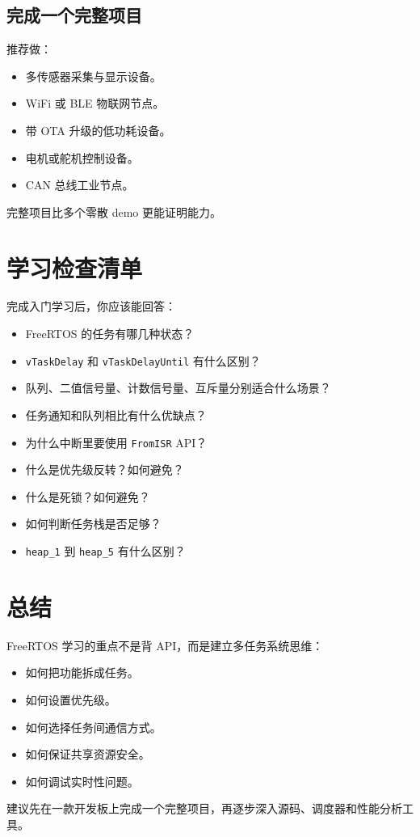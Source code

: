 \documentclass[12pt,a4paper]{ctexart}
\begin{document}
\subsection{完成一个完整项目}

推荐做：

\begin{itemize}
    \item 多传感器采集与显示设备。
    \item WiFi 或 BLE 物联网节点。
    \item 带 OTA 升级的低功耗设备。
    \item 电机或舵机控制设备。
    \item CAN 总线工业节点。
\end{itemize}

完整项目比多个零散 demo 更能证明能力。

\section{学习检查清单}

完成入门学习后，你应该能回答：

\begin{itemize}
    \item FreeRTOS 的任务有哪几种状态？
    \item \texttt{vTaskDelay} 和 \texttt{vTaskDelayUntil} 有什么区别？
    \item 队列、二值信号量、计数信号量、互斥量分别适合什么场景？
    \item 任务通知和队列相比有什么优缺点？
    \item 为什么中断里要使用 \texttt{FromISR} API？
    \item 什么是优先级反转？如何避免？
    \item 什么是死锁？如何避免？
    \item 如何判断任务栈是否足够？
    \item \texttt{heap\_1} 到 \texttt{heap\_5} 有什么区别？
\end{itemize}

\section{总结}

FreeRTOS 学习的重点不是背 API，而是建立多任务系统思维：

\begin{itemize}
    \item 如何把功能拆成任务。
    \item 如何设置优先级。
    \item 如何选择任务间通信方式。
    \item 如何保证共享资源安全。
    \item 如何调试实时性问题。
\end{itemize}

建议先在一款开发板上完成一个完整项目，再逐步深入源码、调度器和性能分析工具。
\end{document}
